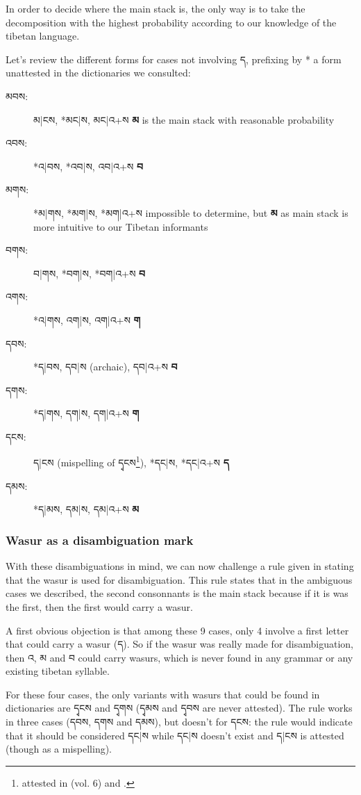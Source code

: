 \documentclass[%
a4paper,%
pagesize,%
12pt,%
parskip=off,%
bibliography=totoc,%
numbers=noenddot,%
DIV=12,%
twoside=semi,%
headings=normal%
]{scrartcl}
\begin{document}
In order to decide where the main stack is, the only way is to take the decomposition with the highest probability according to our knowledge of the tibetan language.

Let's review the different forms for cases not involving ད, prefixing by * a form unattested in the dictionaries we consulted:

\begin{description}
\item[མབས:] མ|ངས, *མང|ས, མང|འ+ས \rightarrow{} \textbf{མ} is the main stack with reasonable probability
\item[འབས:] *འ|བས, *འབ|ས, འབ|འ+ས \rightarrow{} \textbf{བ}
\item[མགས:] *མ|གས, *མག|ས, *མག|འ+ས \rightarrow{} impossible to determine, but \textbf{མ} as main stack is more intuitive to our Tibetan informants
\item[བགས:] བ|གས, *བག|ས, *བག|འ+ས \rightarrow{} \textbf{བ}
\item[འགས:] *འ|གས, འག|ས, འག|འ+ས \rightarrow{} \textbf{ག}
\item[དབས:] *ད|བས, དབ|ས (archaic), དབ|འ+ས \rightarrow{} \textbf{བ}
\item[དགས:] *ད|གས, དག|ས, དག|འ+ས \rightarrow{} \textbf{ག}
\item[དངས:] ད|ངས (mispelling of དྭངས\footnote{attested in \cite{NegiDict} (vol. 6) and \cite{Illuminator}.}), *དང|ས, *དང|འ+ས \rightarrow{} \textbf{ད}
\item[དམས:] *ད|མས, དམ|ས, དམ|འ+ས \rightarrow{} \textbf{མ}
\end{description}

\subsubsection*{Wasur as a disambiguation mark}\label{wasurdisambiguation}

With these disambiguations in mind, we can now challenge a rule given in \cite{MugeGrammar} stating that the wasur is used for disambiguation. This rule states that in the ambiguous cases we described, the second consonnants is the main stack because if it is was the first, then the first would carry a wasur.

A first obvious objection is that among these 9 cases, only 4 involve a first letter that could carry a wasur (ད). So if the wasur was really made for disambiguation, then འ, མ and བ could carry wasurs, which is never found in any grammar or any existing tibetan syllable.

For these four cases, the only variants with wasurs that could be found in dictionaries are དྭངས and དྭགས (དྭམས and དྭབས are never attested). The rule works in three cases (དབས, དགས and དམས), but doesn't for དངས: the rule would indicate that it should be considered དང|ས while དང|ས doesn't exist and ད|ངས is attested (though as a mispelling).
\end{document}
